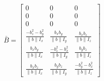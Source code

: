 \[
\bar{B} = \begin{bmatrix}
	0 & 0 & 0 \\
	0 & 0 & 0 \\
	0 & 0 & 0 \\
	\frac{-b_z^2 - b_y^2}{\|b\| I_x} & \frac{b_x b_y}{\|b\| I_y} & \frac{b_x b_z}{\|b\| I_z} \\
	\frac{b_x b_y}{\|b\| I_x} & \frac{-b_z^2 - b_x^2}{\|b\| I_y} & \frac{b_y b_z}{\|b\| I_z} \\
	\frac{b_x b_z}{\|b\| I_x} & \frac{b_y b_z}{\|b\| I_y} & \frac{-b_y^2 - b_x^2}{\|b\| I_z}
\end{bmatrix}
\]
